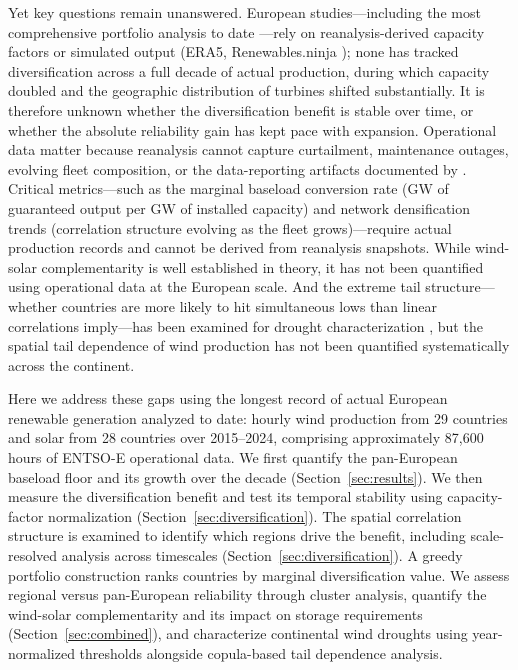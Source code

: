 \documentclass{article}
\begin{document}
Yet key questions remain unanswered. European studies---including the most comprehensive portfolio analysis to date \citep{lopezprol2024}---rely on reanalysis-derived capacity factors or simulated output (ERA5, Renewables.ninja \citep{staffell2016}); none has tracked diversification across a full decade of actual production, during which capacity doubled and the geographic distribution of turbines shifted substantially. It is therefore unknown whether the diversification benefit is stable over time, or whether the absolute reliability gain has kept pace with expansion. Operational data matter because reanalysis cannot capture curtailment, maintenance outages, evolving fleet composition, or the data-reporting artifacts documented by \citet{hirth2018}. Critical metrics---such as the marginal baseload conversion rate (GW of guaranteed output per GW of installed capacity) and network densification trends (correlation structure evolving as the fleet grows)---require actual production records and cannot be derived from reanalysis snapshots. While wind-solar complementarity is well established in theory, it has not been quantified using operational data at the European scale. And the extreme tail structure---whether countries are more likely to hit simultaneous lows than linear correlations imply---has been examined for drought characterization \citep{otero2022copula}, but the spatial tail dependence of wind production has not been quantified systematically across the continent.

Here we address these gaps using the longest record of actual European renewable generation analyzed to date: hourly wind production from 29 countries and solar from 28 countries over 2015--2024, comprising approximately 87,600 hours of ENTSO-E operational data. We first quantify the pan-European baseload floor and its growth over the decade (Section~\ref{sec:results}). We then measure the diversification benefit and test its temporal stability using capacity-factor normalization (Section~\ref{sec:diversification}). The spatial correlation structure is examined to identify which regions drive the benefit, including scale-resolved analysis across timescales (Section~\ref{sec:diversification}). A greedy portfolio construction ranks countries by marginal diversification value. We assess regional versus pan-European reliability through cluster analysis, quantify the wind-solar complementarity and its impact on storage requirements (Section~\ref{sec:combined}), and characterize continental wind droughts using year-normalized thresholds alongside copula-based tail dependence analysis.
\end{document}
